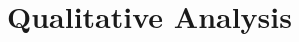\documentclass{llmxive}
\begin{document}







\section{Qualitative Analysis}
\label{app:qualitative_limitations}
\end{document}
